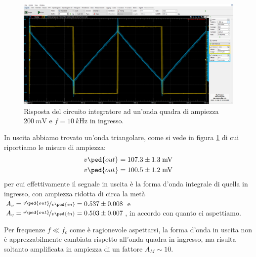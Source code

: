 \documentclass[10pt,a4paper]{article}
\begin{document}
\begin{figure}[htbp]
\centering
\includegraphics[scale=0.42]{integratore}
\caption{Risposta del circuito integratore ad un'onda quadra di ampiezza
$\SI{200}{m\V}$ e $f = \SI{10}{k\Hz}$ in ingresso. \label{fig: intsqw}}
\end{figure}

In uscita abbiamo trovato un'onda triangolare, come si vede in figura
\ref{fig: intsqw} di cui riportiamo le misure di ampiezza:
\begin{align*}
v\ped{out} = 107.3 \pm 1.3 \; \si{m\V} \\
v\ped{out} = 100.5 \pm 1.2 \; \si{m\V}
\end{align*}
per cui effettivamente il segnale in uscita è la forma d'onda integrale
di quella in ingresso, con ampiezza ridotta di circa la metà
$A_v = \nicefrac{v\ped{out}}{v\ped{in}} = 0.537 \pm 0.008$ e $A_v = \nicefrac{v\ped{out}}{v\ped{in}} = 0.503 \pm 0.007$, in accordo con
quanto ci aspettiamo.

Per frequenze $f \ll f_c$ come è ragionevole aspettarsi, la forma d'onda in
uscita non è apprezzabilmente cambiata rispetto all'onda quadra in ingresso,
ma risulta soltanto amplificata in ampiezza di un fattore $A_M \sim 10$.
\end{document}
